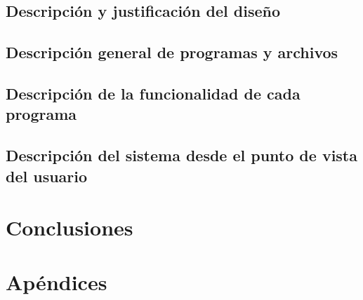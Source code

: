 \documentclass[12pt,letterpaper]{article}
\begin{document}
\subsection{Descripción y justificación del diseño}
\subsection{Descripción general de programas y archivos}
\subsection{Descripción de la funcionalidad de cada programa}
\subsection{Descripción del sistema desde el punto de vista del usuario}
\newpage

\section{Conclusiones}
\newpage

\section{Apéndices}
\newpage
\end{document}
